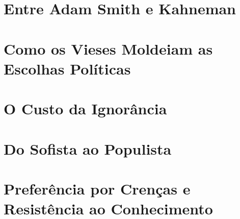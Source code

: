 \section{Entre Adam Smith e Kahneman} %





\section{Como os Vieses Moldeiam as Escolhas Políticas} %

\section{O Custo da Ignorância} %


\section{Do Sofista ao Populista} %



\section{Preferência por Crenças e Resistência ao Conhecimento}



